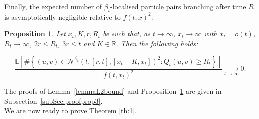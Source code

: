 \documentclass{article}
\newtheorem{proposition}[theorem]{Proposition}
\newcommand{\E}[0]{\mathbb{E}}
\begin{document}
Finally, the expected number of $\beta_t$-localised particle pairs branching after time $R$ is asymptotically negligible relative to $f(t,x)^2$:
\begin{proposition}\label{L2boundlocancestor}
Let $x_t, K, r, R_t$ be such that, as $t\to \infty$, \( x_t \to \infty \) with \( x_t = o(t) \), \( R_t \to \infty \), $2r\leq R_t$, $3r \leq t$ and $K\in \mathbb{R}$. Then the following holds:

\begin{equation}
    \frac{\E\left[\#\left\{(u,v) \in \mathcal{N}^{\beta_t}(t,[r,t],[x_t-K,x_t])^2 : Q_t(u,v) \geq R_t \right\}\right]}{f(t,x_t)^2}\xrightarrow[t\rightarrow \infty]{}0.
\end{equation}
\end{proposition}
The proofs of Lemma~\ref{lemmaL2bound} and Proposition~\ref{L2boundlocancestor} are given in Subsection~\ref{subSec:proofprop3}.\\
We are now ready to prove Theorem \ref{th:1}.
\end{document}
